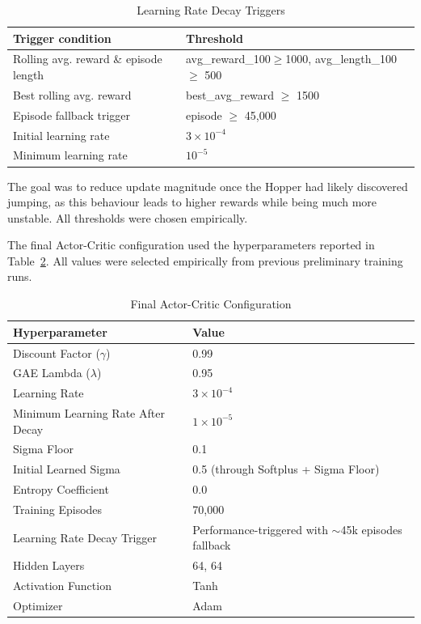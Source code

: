 \begin{table}[ht]
\centering
\caption{Learning Rate Decay Triggers}
\label{tab:lr_decay}
\begin{tabular}{l p{}}
\hline
Trigger condition & Threshold \\
\hline
Rolling avg. reward \& episode length & avg\_reward\_100$\geq$1000, avg\_length\_100 $\geq$ 500 \\
Best rolling avg. reward & best\_avg\_reward $\geq$ 1500 \\
Episode fallback trigger & episode $\geq$ 45,000 \\
Initial learning rate & $3 \times 10^{-4}$ \\
Minimum learning rate & $10^{-5}$ \\
\hline
\end{tabular}
\end{table}

The goal was to reduce update magnitude once the Hopper had likely discovered jumping, as this behaviour leads to
higher rewards while being much more unstable. All thresholds were chosen empirically.


The final Actor-Critic configuration used the hyperparameters reported in Table~\ref{tab:ac_configuration}.
All values were selected empirically from previous preliminary training runs.


\begin{table}[h]
\centering
\caption{Final Actor-Critic Configuration}
\label{tab:ac_configuration}
\begin{tabular}{l p{}}
\hline
Hyperparameter & Value \\
\hline
Discount Factor ($\gamma$) & 0.99 \\
GAE Lambda ($\lambda$) & 0.95 \\
Learning Rate & $3 \times 10^{-4}$ \\
Minimum Learning Rate After Decay & $1 \times 10^{-5}$ \\
Sigma Floor & 0.1 \\
Initial Learned Sigma & 0.5 (through Softplus + Sigma Floor) \\
Entropy Coefficient & 0.0 \\
Training Episodes & 70,000 \\
Learning Rate Decay Trigger & Performance-triggered with $\sim$45k episodes fallback \\
Hidden Layers & 64, 64 \\
Activation Function & Tanh \\
Optimizer & Adam \\
\hline
\end{tabular}
\end{table}



